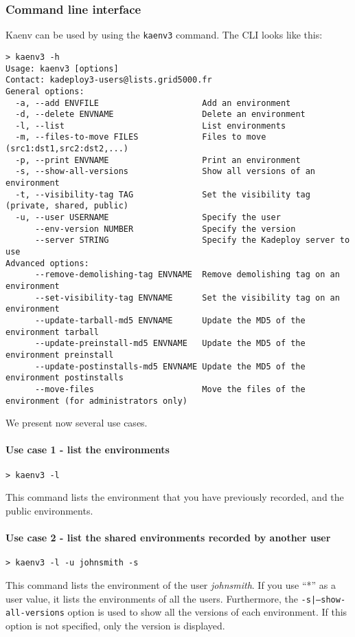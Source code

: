 \documentclass[a4wide,10pt,oneside]{book}
\begin{document}
\subsubsection{Command line interface}
Kaenv can be used by using the \texttt{kaenv3} command. The CLI looks like this:
\begin{small}
\begin{verbatim}
> kaenv3 -h
Usage: kaenv3 [options]
Contact: kadeploy3-users@lists.grid5000.fr
General options:
  -a, --add ENVFILE                     Add an environment
  -d, --delete ENVNAME                  Delete an environment
  -l, --list                            List environments
  -m, --files-to-move FILES             Files to move (src1:dst1,src2:dst2,...)
  -p, --print ENVNAME                   Print an environment
  -s, --show-all-versions               Show all versions of an environment
  -t, --visibility-tag TAG              Set the visibility tag (private, shared, public)
  -u, --user USERNAME                   Specify the user
      --env-version NUMBER              Specify the version
      --server STRING                   Specify the Kadeploy server to use
Advanced options:
      --remove-demolishing-tag ENVNAME  Remove demolishing tag on an environment
      --set-visibility-tag ENVNAME      Set the visibility tag on an environment
      --update-tarball-md5 ENVNAME      Update the MD5 of the environment tarball
      --update-preinstall-md5 ENVNAME   Update the MD5 of the environment preinstall
      --update-postinstalls-md5 ENVNAME Update the MD5 of the environment postinstalls
      --move-files                      Move the files of the environment (for administrators only)
\end{verbatim}
\end{small}

We present now several use cases.
\paragraph{Use case 1 - list the environments}
\begin{verbatim}
> kaenv3 -l
\end{verbatim}
This command lists the environment that you have previously recorded, and the public environments.

\paragraph{Use case 2 - list the shared environments recorded by another user}
\begin{verbatim}
> kaenv3 -l -u johnsmith -s
\end{verbatim}
This command lists the environment of the user \textit{johnsmith}. If you use ``*'' as a user value, it lists the environments of all the users. Furthermore, the \texttt{-s|--show-all-versions} option is used to show all the versions of each environment. If this option is not specified, only the version is displayed.
\end{document}
